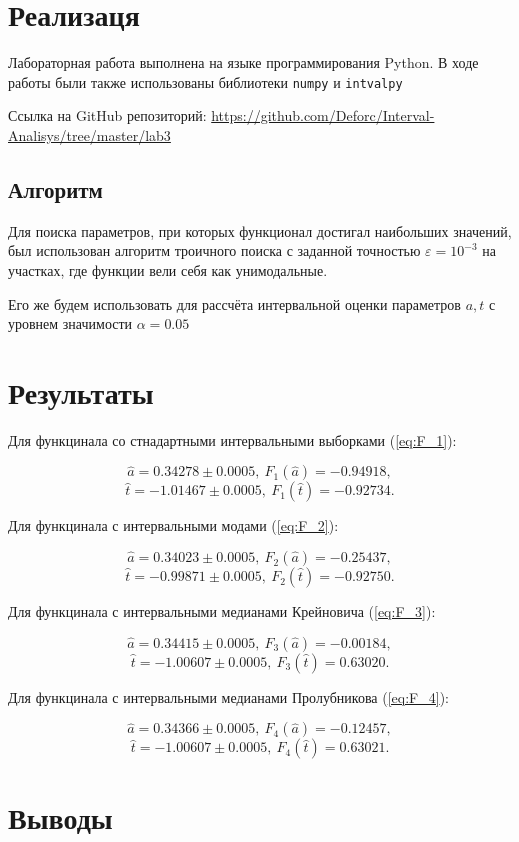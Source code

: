 \documentclass{article}
\begin{document}
  \section{Реализаця}

  Лабораторная работа выполнена на языке программирования Python. В ходе
  работы были также использованы библиотеки \verb!numpy! и \verb!intvalpy!

  Ссылка на GitHub репозиторий:
  \url{https://github.com/Deforc/Interval-Analisys/tree/master/lab3}

  \subsection{Алгоритм}

  Для поиска параметров, при которых функционал достигал наибольших
  значений, был использован алгоритм троичного поиска с заданной точностью
  \( \varepsilon = 10^{-3} \) на участках, где функции вели
  себя как унимодальные.

  Его же будем использовать для рассчёта интервальной оценки параметров \( a, t\) с уровнем значимости \( \alpha = 0.05 \)

  \section{Результаты}

  Для функцинала со стнадартными интервальными выборками (\ref{eq:F_1}):

  \[ \hat a = 0.34278 \pm 0.0005, \ F_1 (\hat a) = -0.94918, \]
  \[ \hat t = -1.01467 \pm 0.0005, \ F_1 (\hat t) = -0.92734. \]

  Для функцинала с интервальными модами (\ref{eq:F_2}):

  \[ \hat a = 0.34023 \pm 0.0005, \ F_2 (\hat a) = -0.25437, \]
  \[ \hat t = -0.99871 \pm 0.0005, \ F_2 (\hat t) = -0.92750. \]

  Для функцинала с интервальными медианами Крейновича (\ref{eq:F_3}):

  \[ \hat a = 0.34415 \pm 0.0005, \ F_3 (\hat a) = -0.00184, \]
  \[ \hat t = -1.00607 \pm 0.0005, \ F_3 (\hat t) = 0.63020. \]

  Для функцинала с интервальными медианами Пролубникова (\ref{eq:F_4}):

  \[ \hat a = 0.34366 \pm 0.0005, \ F_4 (\hat a) = -0.12457, \]
  \[ \hat t = -1.00607 \pm 0.0005, \ F_4 (\hat t) = 0.63021. \]
  \section{Выводы}
\end{document}
